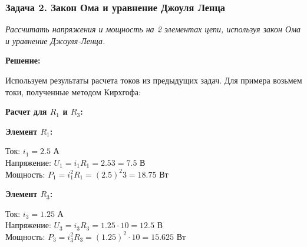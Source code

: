 \subsubsection{Задача 2. Закон Ома и уравнение Джоуля Ленца}
\textit{Рассчитать напряжения и мощность на 2 элементах цепи, используя закон Ома и уравнение Джоуля-Ленца.}

\textbf{Решение:}

Используем результаты расчета токов из предыдущих задач. Для примера возьмем токи, полученные методом Кирхгофа:

\textbf{Расчет для $R_1$ и $R_3$:}

\textbf{Элемент $R_1$:}
\begin{flushleft}
Ток: $i_1 = 2.5$ А \\
Напряжение: $U_1 = i_1R_1 = 2.5 3 = 7.5$ В \\
Мощность: $P_1 = i_1^2R_1 = (2.5)^2  3 = 18.75$ Вт
\end{flushleft}

\textbf{Элемент $R_3$:}
\begin{flushleft}
Ток: $i_3 = 1.25$ А \\
Напряжение: $U_3 = i_3R_3 = 1.25 \cdot 10 = 12.5$ В \\
Мощность: $P_3 = i_3^2R_3 = (1.25)^2 \cdot 10 = 15.625$ Вт
\end{flushleft}

